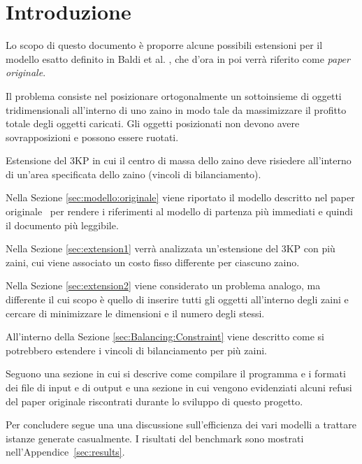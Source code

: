 \section{Introduzione}
\setcounter{equation}{4}

Lo scopo di questo documento è proporre alcune possibili estensioni per il 
modello esatto definito in Baldi et al. \cite{Baldi20129802}, 
che d'ora in poi verrà riferito come \emph{paper originale}.

\begin{problem}[3KP]
Il problema consiste nel posizionare ortogonalmente un sottoinsieme di 
oggetti tridimensionali all'interno di uno zaino in modo tale da 
massimizzare il profitto totale degli oggetti caricati. 
Gli oggetti posizionati non devono avere sovrapposizioni e possono 
essere ruotati.
\end{problem}

\begin{problem}[3BKP]
Estensione del 3KP in cui il centro di massa dello zaino deve risiedere
all'interno di un'area specificata dello zaino (vincoli di bilanciamento).
\end{problem}

Nella Sezione \ref{sec:modello:originale} viene riportato il modello descritto 
nel paper originale~\cite{Baldi20129802} per rendere i riferimenti al modello
di partenza più immediati e quindi il documento più leggibile.

Nella Sezione \ref{sec:extension1} verrà analizzata un'estensione del 3KP con 
più zaini, cui viene associato un costo fisso differente per ciascuno zaino.

Nella Sezione \ref{sec:extension2} viene considerato un problema analogo, 
ma differente il cui scopo è quello di inserire tutti gli oggetti all'interno 
degli zaini e cercare di minimizzare le dimensioni e il numero degli stessi. 

All'interno della Sezione \ref{sec:Balancing:Constraint} viene descritto come 
si potrebbero estendere i vincoli di bilanciamento per più zaini. 


Seguono una sezione in cui si descrive come compilare il 
programma e i formati dei file di input e di output e una sezione in cui
vengono evidenziati alcuni refusi 
del paper originale riscontrati durante lo sviluppo di questo progetto.

Per concludere segue una una discussione sull'efficienza dei vari
modelli a trattare istanze generate casualmente.
I risultati del benchmark sono mostrati nell'Appendice~\ref{sec:results}.

